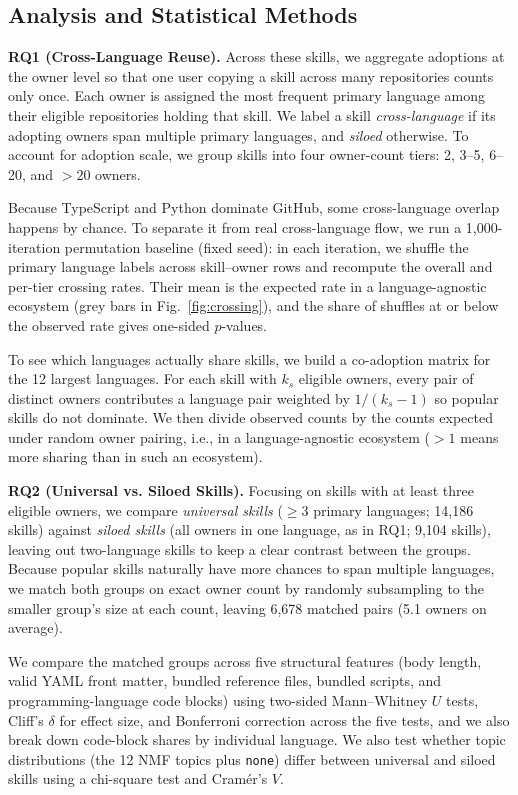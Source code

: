 \subsection{Analysis and Statistical Methods}
\textbf{RQ1 (Cross-Language Reuse).} Across these skills, we aggregate adoptions at the owner level so that one user copying a skill across many repositories counts only once. Each owner is assigned the most frequent primary language among their eligible repositories holding that skill. We label a skill \emph{cross-language} if its adopting owners span multiple primary languages, and \emph{siloed} otherwise. To account for adoption scale, we group skills into four owner-count tiers: 2, 3--5, 6--20, and $>20$ owners.

Because TypeScript and Python dominate GitHub, some cross-language overlap happens by chance. To separate it from real cross-language flow, we run a 1,000-iteration permutation baseline (fixed seed): in each iteration, we shuffle the primary language labels across skill--owner rows and recompute the overall and per-tier crossing rates. Their mean is the expected rate in a language-agnostic ecosystem (grey bars in Fig.~\ref{fig:crossing}), and the share of shuffles at or below the observed rate gives one-sided $p$-values.

To see which languages actually share skills, we build a co-adoption matrix for the 12 largest languages. For each skill with $k_s$ eligible owners, every pair of distinct owners contributes a language pair weighted by $1/(k_s - 1)$ so popular skills do not dominate. We then divide observed counts by the counts expected under random owner pairing, i.e., in a language-agnostic ecosystem ($>1$ means more sharing than in such an ecosystem).

\textbf{RQ2 (Universal vs. Siloed Skills).} Focusing on skills with at least three eligible owners, we compare \emph{universal skills} ($\ge 3$ primary languages; 14,186 skills) against \emph{siloed skills} (all owners in one language, as in RQ1; 9,104 skills), leaving out two-language skills to keep a clear contrast between the groups. Because popular skills naturally have more chances to span multiple languages, we match both groups on exact owner count by randomly subsampling to the smaller group's size at each count, leaving 6,678 matched pairs (5.1 owners on average).

We compare the matched groups across five structural features (body length, valid YAML front matter, bundled reference files, bundled scripts, and programming-language code blocks) using two-sided Mann--Whitney $U$ tests, Cliff's $\delta$ for effect size, and Bonferroni correction across the five tests, and we also break down code-block shares by individual language. We also test whether topic distributions (the 12 NMF topics plus \texttt{none}) differ between universal and siloed skills using a chi-square test and Cram\'er's $V$.

